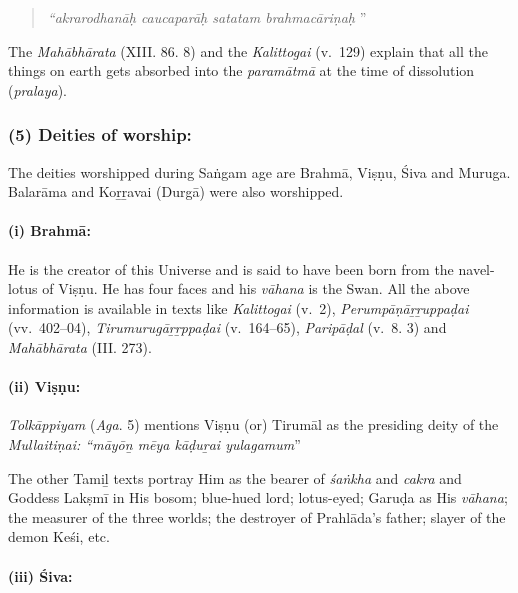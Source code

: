 \begin{quote}
\textit{“akrarodhanāḥ caucaparāḥ satatam brahmacāriṇaḥ }”
\end{quote}

The \textit{Mahābhārata} (XIII. 86. 8) and the \textit{Kalittogai} (v.~129) explain that all the things on earth gets absorbed into the \textit{paramātmā} at the time of dissolution (\textit{pralaya}).


\subsubsection*{(5) Deities of worship:}

\vskip -7pt

The deities worshipped during Saṅgam age are Brahmā, Viṣṇu, Śiva and Muruga. Balarāma and Koṟṟavai (Durgā) were also worshipped.

\paragraph*{(i) Brahmā:}

\vskip -7.5pt

He is the creator of this Universe and is said to have been born from the navel-lotus of Viṣṇu. He has four faces and his \textit{vāhana} is the Swan. All the above information is available in texts like \textit{Kalittogai} (v.~2), \textit{Perumpāṇāṟṟuppaḍai} (vv.~402–04), \textit{Tirumurugāṟṟppaḍai} (v.~164–65), \textit{Paripāḍal} (v.~8. 3) and \textit{Mahābhārata} (III. 273).


\paragraph*{(ii) Viṣṇu:}

\vskip -7.5pt

\textit{Tolkāppiyam} (\textit{Aga}. 5) mentions Viṣṇu (or) Tirumāl as the presiding deity of the \textit{Mullaitiṇai: “māyōṉ mēya kāḍuṟai yulagamum}”

The other Tamiḻ texts portray Him as the bearer of \textit{śaṅkha} and \textit{cakra} and Goddess Lakṣmī in His bosom; blue-hued lord; lotus-eyed; Garuḍa as His \textit{vāhana}; the measurer of the three worlds; the destroyer of Prahlāda’s father; slayer of the demon Keśi, etc.


\paragraph*{(iii) Śiva:}

